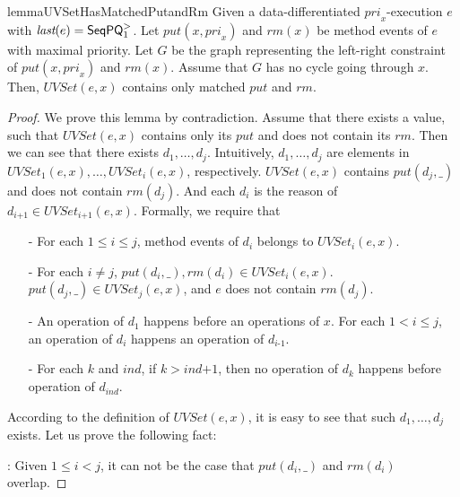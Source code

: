 \begin{restatable}{lemma}{UVSetHasMatchedPutandRm}
\label{lemma:UVSet has matched put and rm}
Given a data-differentiated $\textit{pri}_x$-execution $e$ with $\textit{last}(e) = \mathsf{SeqPQ}_1^{>}$. Let $\textit{put}(x,\textit{pri}_x)$ and $\textit{rm}(x)$ be method events of $e$ with maximal priority. Let $G$ be the graph representing the left-right constraint of $\textit{put}(x,\textit{pri}_x)$ and $\textit{rm}(x)$. Assume that $G$ has no cycle going through $x$. Then, $\textit{UVSet}(e,x)$ contains only matched $\textit{put}$ and $\textit{rm}$.
\end{restatable}
\begin {proof}

We prove this lemma by contradiction. Assume that there exists a value, such that $\textit{UVSet}(e,x)$ contains only its $\textit{put}$ and does not contain its $\textit{rm}$. Then we can see that there exists $d_1,\ldots,d_j$. Intuitively, $d_1,\ldots,d_j$ are elements in $\textit{UVSet}_1(e,x), \ldots, \textit{UVSet}_i(e,x)$, respectively. $\textit{UVSet}(e,x)$ contains $\textit{put}(d_j,\_)$ and does not contain $\textit{rm}(d_j)$. And each $d_i$ is the reason of $d_{\textit{i+1}} \in \textit{UVSet}_{\textit{i+1}}(e,x)$. Formally, we require that

\begin{itemize}
\setlength{\itemsep}{0.5pt}
\item[-] For each $1 \leq i \leq j$, method events of $d_i$ belongs to $\textit{UVSet}_i(e,x)$.

\item[-] For each $i \neq j$, $\textit{put}(d_i,\_),\textit{rm}(d_i) \in \textit{UVSet}_i(e,x)$. $\textit{put}(d_j,\_) \in \textit{UVSet}_j(e,x)$, and $e$ does not contain $\textit{rm}(d_j)$.

\item[-] An operation of $d_1$ happens before an operations of $x$. For each $1 < i \leq j$, an operation of $d_i$ happens an operation of $d_{\textit{i-1}}$.

\item[-] For each $k$ and $\textit{ind}$, if $k > \textit{ind+1}$, then no operation of $d_k$ happens before operation of $d_{\textit{ind}}$.
\end{itemize}

According to the definition of $\textit{UVSet}(e,x)$, it is easy to see that such $d_1,\ldots,d_j$ exists. Let us prove the following fact:

: Given $1 \leq i < j$, it can not be the case that $\textit{put}(d_i,\_)$ and $\textit{rm}(d_i)$ overlap.


\end{proof}

